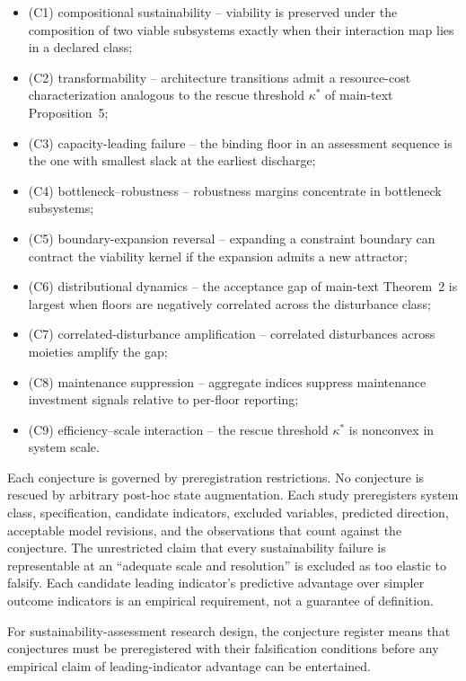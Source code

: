 \begin{itemize}[leftmargin=2em]
\item (C1) compositional sustainability -- viability is preserved under the composition of two viable subsystems exactly when their interaction map lies in a declared class;
\item (C2) transformability -- architecture transitions admit a resource-cost characterization analogous to the rescue threshold $\kappa^*$ of main-text Proposition~5;
\item (C3) capacity-leading failure -- the binding floor in an assessment sequence is the one with smallest slack at the earliest discharge;
\item (C4) bottleneck--robustness -- robustness margins concentrate in bottleneck subsystems;
\item (C5) boundary-expansion reversal -- expanding a constraint boundary can contract the viability kernel if the expansion admits a new attractor;
\item (C6) distributional dynamics -- the acceptance gap of main-text Theorem~2 is largest when floors are negatively correlated across the disturbance class;
\item (C7) correlated-disturbance amplification -- correlated disturbances across moieties amplify the gap;
\item (C8) maintenance suppression -- aggregate indices suppress maintenance investment signals relative to per-floor reporting;
\item (C9) efficiency--scale interaction -- the rescue threshold $\kappa^*$ is nonconvex in system scale.
\end{itemize}

Each conjecture is governed by preregistration restrictions. No conjecture is rescued by arbitrary post-hoc state augmentation. Each study preregisters system class, specification, candidate indicators, excluded variables, predicted direction, acceptable model revisions, and the observations that count against the conjecture. The unrestricted claim that every sustainability failure is representable at an ``adequate scale and resolution'' is excluded as too elastic to falsify. Each candidate leading indicator's predictive advantage over simpler outcome indicators is an empirical requirement, not a guarantee of definition.

For sustainability-assessment research design, the conjecture register means that conjectures must be preregistered with their falsification conditions before any empirical claim of leading-indicator advantage can be entertained.

